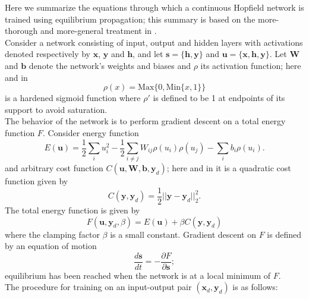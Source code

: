 \documentclass[format=sigconf]{acmart}
\newcommand{\mtx}[1]{\bm{#1}}
\newcommand{\npar}{\\\indent}
\begin{document}
Here we summarize the equations through which a continuous Hopfield network is trained using equilibrium propagation; this summary is based on the more-thorough and more-general treatment in \cite{scellier17}.
\npar
Consider a network consisting of input, output and hidden layers with activations denoted respectively by $\mtx{x}$, $\mtx{y}$ and $\mtx{h}$, and let $\mtx{s}=\{\mtx{h},\mtx{y}\}$ and $\mtx{u}=\{\mtx{x}, \mtx{h},\mtx{y}\}$. Let $\mtx{W}$ and $\mtx{b}$ denote the network's weights and biases and $\rho$ its activation function; here and in \cite{scellier17}
\begin{equation}
\label{eqn:hardened_sigmoid}
\rho(x)=\text{Max}\{0, \text{Min}\{x, 1\}\} 
\end{equation} is a hardened sigmoid function
where $\rho'$ is defined to be 1 at endpoints of its support to avoid saturation.
\npar
The behavior of the network is to perform gradient descent on a total energy function $F$. Consider energy function
\begin{equation}
E(\mtx{u})=\frac{1}{2}\sum_iu_i^2-\frac{1}{2}\sum_{i\neq j}W_{ij}\rho(u_i)\rho(u_j)-\sum_ib_i\rho(u_i).
\end{equation}
and arbitrary cost function $C(\mtx{u}, \mtx{W}, \mtx{b}, \mtx{y}_d)$; here and in \cite{scellier17} it is a quadratic cost function given by
\begin{equation}
\label{eqn:cost}
C(\mtx{y},\mtx{y}_d)=\frac{1}{2}||\mtx{y}-\mtx{y}_d||_2^2.
\end{equation}
The total energy function is given by
\begin{equation}
F(\mtx{u},\mtx{y}_d, \beta)=E(\mtx{u})+\beta C(\mtx{y},\mtx{y}_d)
\end{equation}
where the clamping factor $\beta$ is a small constant. Gradient descent on $F$ is defined by an equation of motion
\begin{equation}
\label{eqn:dynamics}
\frac{d\mtx{s}}{dt}=-\frac{\partial F}{\partial \mtx{s}};
\end{equation}
equilibrium has been reached when the network is at a local minimum of $F$.
\npar
The procedure for training on an input-output pair $(\mtx{x}_d,\mtx{y}_d)$ is as follows:
\end{document}
